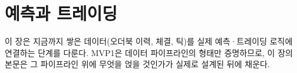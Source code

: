 \chapter{예측과 트레이딩}
\label{ch:prediction}

이 장은 지금까지 쌓은 데이터(오더북 이력, 체결, 틱)를 실제 예측·트레이딩 로직에
연결하는 단계를 다룬다. MVP1은 데이터 파이프라인의 형태만 증명하므로, 이 장의 본문은
그 파이프라인 위에 무엇을 얹을 것인가가 실제로 설계된 뒤에 채운다.

